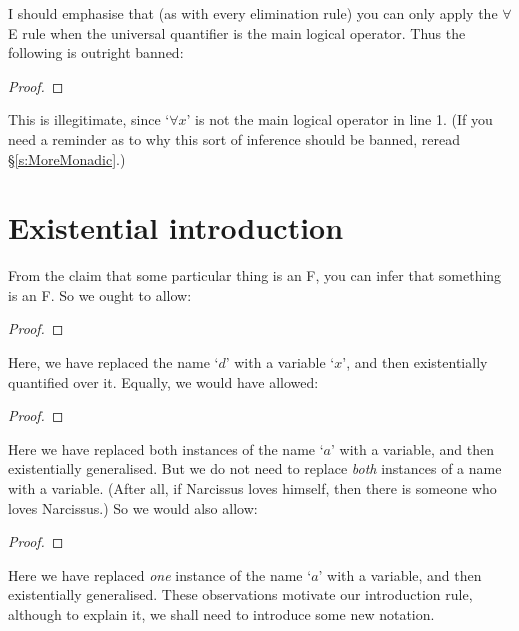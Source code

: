 I should emphasise that (as with every elimination rule) you can only apply the $\forall$E rule when the universal quantifier is the main logical operator. Thus the following is outright banned:
\begin{proof}
\end{proof}
This is illegitimate, since `$\forall x$' is not the main logical operator in line 1. (If you need a reminder as to why this sort of inference should be banned, reread \S\ref{s:MoreMonadic}.)

\section{Existential introduction}
From the claim that some particular thing is an F, you can infer that something is an F. So we ought to allow:
\begin{proof}
	 
\end{proof}
Here, we have replaced the name `$d$' with a variable `$x$', and then existentially quantified over it. Equally, we would have allowed:
\begin{proof}
	 
\end{proof}
Here we have replaced both instances of the name `$a$' with a variable, and then existentially generalised. But we do not need to replace \emph{both} instances of a name with a variable. (After all, if Narcissus loves himself, then there is someone who loves Narcissus.) So we would also allow:
\begin{proof}
	 
\end{proof}
Here we have replaced \emph{one} instance of the name `$a$' with a variable, and then existentially generalised. These observations motivate our introduction rule, although to explain it, we shall need to introduce some new notation.

